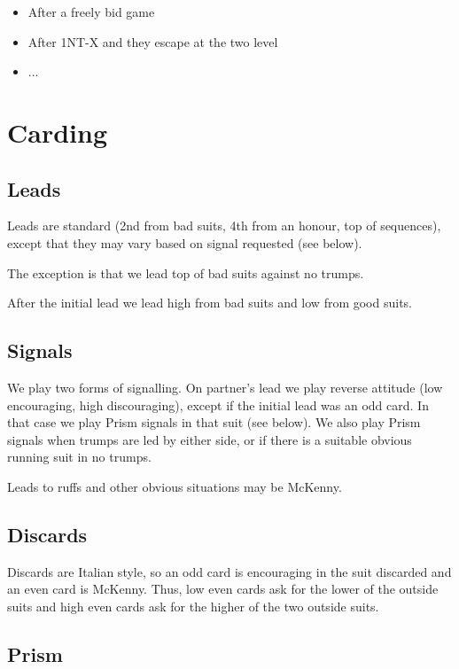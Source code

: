 \documentclass[a4paper,14pt]{extarticle}
\begin{document}
\begin{itemize}
\item After a freely bid game
\item After 1NT-X and they escape at the two level
\item ...
\end{itemize}

\newpage

\section{Carding}
\label{sec:carding}

\subsection{Leads}
\label{sec:card:leads}

Leads are standard (2nd from bad suits, 4th from an honour, top of sequences),
except that they may vary based on signal requested (see below).

The exception is that we lead top of bad suits against no trumps.

After the initial lead we lead high from bad suits and low from good suits.

\subsection{Signals}
\label{sec:card:signals}

We play two forms of signalling. On partner's lead we play reverse attitude
(low encouraging, high discouraging), except if the initial lead was an odd
card. In that case we play Prism signals in that suit (see below). We also play
Prism signals when trumps are led by either side, or if there is a suitable
obvious running suit in no trumps.

Leads to ruffs and other obvious situations may be McKenny.

\subsection{Discards}
\label{sec:card:discards}

Discards are Italian style, so an odd card is encouraging in the suit discarded
and an even card is McKenny. Thus, low even cards ask for the lower of the
outside suits and high even cards ask for the higher of the two outside
suits.

\newpage
\subsection{Prism}
\label{sec:card:prism}
\end{document}
